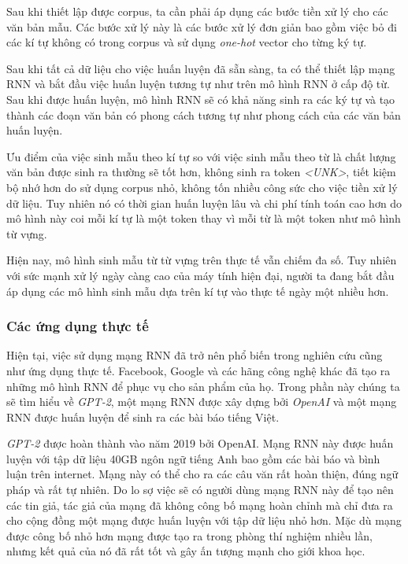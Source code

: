 Sau khi thiết lập được corpus, ta cần phải áp dụng các bước tiền xử lý cho các văn bản mẫu. Các bước xử lý này là các bước xử lý đơn giản bao gồm việc bỏ đi các kí tự không có trong corpus và sử dụng \textit{one-hot} vector cho từng ký tự.

Sau khi tất cả dữ liệu cho việc huấn luyện đã sẵn sàng, ta có thể thiết lập mạng RNN và bắt đầu việc huấn luyện tương tự như trên mô hình RNN ở cấp độ từ. Sau khi được huấn luyện, mô hình RNN sẽ có khả năng sinh ra các ký tự và tạo thành các đoạn văn bản có phong cách tương tự như phong cách của các văn bản huấn luyện.

Ưu điểm của việc sinh mẫu theo kí tự so với việc sinh mẫu theo từ là chất lượng văn bản được sinh ra thường sẽ tốt hơn, không sinh ra token \textit{<UNK>}, tiết kiệm bộ nhớ hơn do sử dụng corpus nhỏ, không tốn nhiều công sức cho việc tiền xử lý dữ liệu. Tuy nhiên nó có thời gian huấn luyện lâu và chi phí tính toán cao hơn do mô hình này coi mỗi kí tự là một token thay vì mỗi từ là một token như mô hình từ vựng.

Hiện nay, mô hình sinh mẫu từ từ vựng trên thực tế vẫn chiếm đa số. Tuy nhiên với sức mạnh xử lý ngày càng cao của máy tính hiện đại, người ta đang bắt đầu áp dụng các mô hình sinh mẫu dựa trên kí tự vào thực tế ngày một nhiều hơn.

\subsubsection{Các ứng dụng thực tế}
Hiện tại, việc sử dụng mạng RNN đã trở nên phổ biến trong nghiên cứu cũng như ứng dụng thực tế. Facebook, Google và các hãng công nghệ khác đã tạo ra những mô hình RNN để phục vụ cho sản phẩm của họ. Trong phần này chúng ta sẽ tìm hiểu về \textit{GPT-2}, một mạng RNN được xây dựng bởi \textit{OpenAI} và một mạng RNN được huấn luyện để sinh ra các bài báo tiếng Việt.

\textit{GPT-2} được hoàn thành vào năm 2019 bởi OpenAI. Mạng RNN này được huấn luyện với tập dữ liệu 40GB ngôn ngữ tiếng Anh bao gồm các bài báo và bình luận trên internet. Mạng này có thể cho ra các câu văn rất hoàn thiện, đúng ngữ pháp và rất tự nhiên. Do lo sợ việc sẽ có người dùng mạng RNN này để tạo nên các tin giả, tác giả của mạng đã không công bố mạng hoàn chỉnh mà chỉ đưa ra cho cộng đồng một mạng được huấn luyện với tập dữ liệu nhỏ hơn. Mặc dù mạng được công bố nhỏ hơn mạng được tạo ra trong phòng thí nghiệm nhiều lần, nhưng kết quả của nó đã rất tốt và gây ấn tượng mạnh cho giới khoa học.


